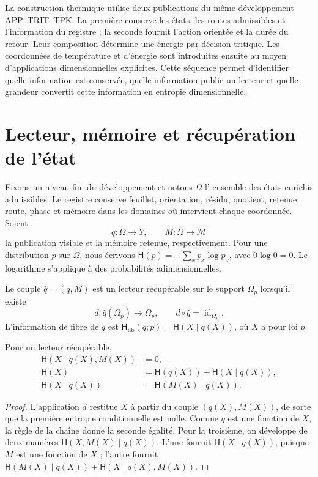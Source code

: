 La construction thermique utilise deux publications du même développement APP--TRIT--TPK. La première conserve les états, les routes admissibles et l'information du registre ; la seconde fournit l'action orientée et la durée du retour. Leur composition détermine une énergie par décision tritique. Les coordonnées de température et d'énergie sont introduites ensuite au moyen d'applications dimensionnelles explicites. Cette séquence permet d'identifier quelle information est conservée, quelle information publie un lecteur et quelle grandeur convertit cette information en entropie dimensionnelle.

\section{Lecteur, mémoire et récupération de l'état}

Fixons un niveau fini du développement et notons \(\Omega\) l'
ensemble des états enrichis admissibles. Le registre conserve feuillet,
orientation, résidu, quotient, retenue, route, phase et mémoire dans les
domaines où intervient chaque coordonnée. Soient
\[
 q:\Omega\longrightarrow Y,\qquad
 M:\Omega\longrightarrow\mathcal M
\]
la publication visible et la mémoire retenue, respectivement. Pour une
distribution \(p\) sur \(\Omega\), nous écrivons
\(\mathsf H(p)=-\sum_xp_x\log p_x\), avec \(0\log0=0\).
Le logarithme s'applique à des probabilités adimensionnelles.

\begin{definition}
Le couple \(\widehat q=(q,M)\) est un lecteur récupérable sur le support
\(\Omega_p\) lorsqu'il existe
\[
 d:\widehat q(\Omega_p)\longrightarrow\Omega_p,
 \qquad d\circ\widehat q=\operatorname{id}_{\Omega_p}.
\]
L'information de fibre de \(q\) est
\(\mathsf H_{\mathrm{fib}}(q;p)=\mathsf H(X\mid q(X))\), où
\(X\) a pour loi \(p\).
\end{definition}

\begin{proposition}
Pour un lecteur récupérable,
\begin{align}
 \mathsf H(X\mid q(X),M(X))&=0,\\
 \mathsf H(X)&=\mathsf H(q(X))+\mathsf H(X\mid q(X)),\\
 \mathsf H(X\mid q(X))&=\mathsf H(M(X)\mid q(X)).
 \label{x_reciprocidad:v:ant:eq:ii-kb-aut-fibra}
\end{align}
\end{proposition}
\begin{proof}
L'application \(d\) restitue \(X\) à partir du couple \((q(X),M(X))\),
de sorte que la première entropie conditionnelle est nulle. Comme \(q\) est
une fonction de \(X\), la règle de la chaîne donne la seconde égalité.
Pour la troisième, on développe de deux manières
\(\mathsf H(X,M(X)\mid q(X))\). L'une fournit
\(\mathsf H(X\mid q(X))\), puisque \(M\) est une fonction de \(X\) ;
l'autre fournit
\(\mathsf H(M(X)\mid q(X))+\mathsf H(X\mid q(X),M(X))\).
\end{proof}

